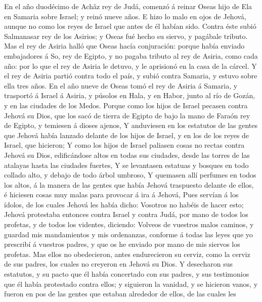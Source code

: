  En el año duodécimo de Achâz rey de Judá, comenzó á reinar
Oseas hijo de Ela en Samaria sobre Israel; y reinó nueve años.
 E hizo lo malo en ojos de Jehová, aunque no como los reyes
de Israel que antes de él habían sido.  Contra éste subió
Salmanasar rey de los Asirios; y Oseas fué hecho su siervo, y pagábale
tributo.  Mas el rey de Asiria halló que Oseas hacía
conjuración: porque había enviado embajadores á So, rey de Egipto, y no
pagaba tributo al rey de Asiria, como cada año: por lo que el rey de
Asiria le detuvo, y le aprisionó en la casa de la cárcel.  Y
el rey de Asiria partió contra todo el país, y subió contra Samaria, y
estuvo sobre ella tres años.  En el año nueve de Oseas tomó
el rey de Asiria á Samaria, y trasportó á Israel á Asiria, y púsolos en
Hala, y en Habor, junto al río de Gozán, y en las ciudades de los Medos.
 Porque como los hijos de Israel pecasen contra Jehová su
Dios, que los sacó de tierra de Egipto de bajo la mano de Faraón rey de
Egipto, y temiesen á dioses ajenos,  Y anduviesen en los
estatutos de las gentes que Jehová había lanzado delante de los hijos de
Israel, y en los de los reyes de Israel, que hicieron;  Y
como los hijos de Israel paliasen cosas no rectas contra Jehová su Dios,
edificándose altos en todas sus ciudades, desde las torres de las
atalayas hasta las ciudades fuertes,  Y se levantasen
estatuas y bosques en todo collado alto, y debajo de todo árbol umbroso,
 Y quemasen allí perfumes en todos los altos, á la manera
de las gentes que había Jehová traspuesto delante de ellos, é hiciesen
cosas muy malas para provocar á ira á Jehová,  Pues servían
á los ídolos, de los cuales Jehová les había dicho: Vosotros no habéis
de hacer esto;  Jehová protestaba entonces contra Israel y
contra Judá, por mano de todos los profetas, y de todos los videntes,
diciendo: Volveos de vuestros malos caminos, y guardad mis mandamientos
y mis ordenanzas, conforme á todas las leyes que yo prescribí á vuestros
padres, y que os he enviado por mano de mis siervos los profetas.
 Mas ellos no obedecieron, antes endurecieron su cerviz,
como la cerviz de sus padres, los cuales no creyeron en Jehová su Dios.
 Y desecharon sus estatutos, y su pacto que él había
concertado con sus padres, y sus testimonios que él había protestado
contra ellos; y siguieron la vanidad, y se hicieron vanos, y fueron en
pos de las gentes que estaban alrededor de ellos, de las cuales les
